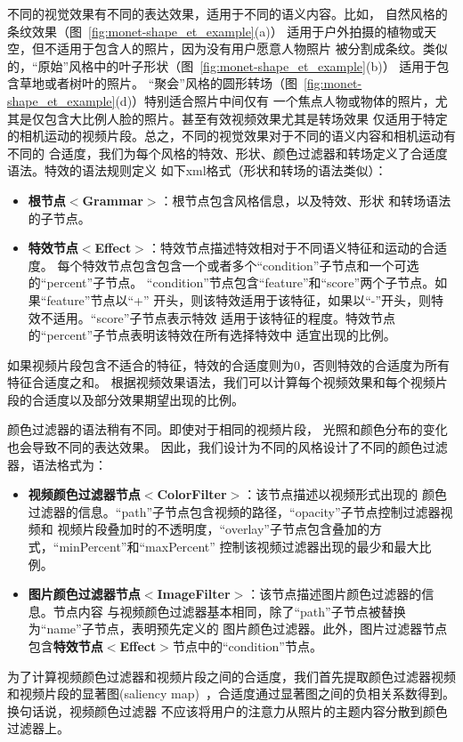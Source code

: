 不同的视觉效果有不同的表达效果，适用于不同的语义内容。比如，
自然风格的条纹效果（图~\ref{fig:monet-shape_et_example}(a)）
适用于户外拍摄的植物或天空，但不适用于包含人的照片，因为没有用户愿意人物照片
被分割成条纹。类似的，``原始''风格中的叶子形状（图~\ref{fig:monet-shape_et_example}(b)）
适用于包含草地或者树叶的照片。
``聚会''风格的圆形转场（图~\ref{fig:monet-shape_et_example}(d)）特别适合照片中间仅有
一个焦点人物或物体的照片，尤其是仅包含大比例人脸的照片。甚至有效视频效果尤其是转场效果
仅适用于特定的相机运动的视频片段。总之，不同的视觉效果对于不同的语义内容和相机运动有不同的
合适度，我们为每个风格的特效、形状、颜色过滤器和转场定义了合适度语法。特效的语法规则定义
如下xml格式（形状和转场的语法类似）：
\begin{itemize}
    \item \textbf{根节点$<$Grammar$>$}：根节点包含风格信息，以及特效、形状
        和转场语法的子节点。
    \item
        \textbf{特效节点$<$Effect$>$}：特效节点描述特效相对于不同语义特征和运动的合适度。
        每个特效节点包含包含一个或者多个``condition''子节点和一个可选的``percent''子节点。
        ``condition''节点包含``feature''和``score''两个子节点。如果``feature''节点以``+''
        开头，则该特效适用于该特征，如果以``-''开头，则特效不适用。``score''子节点表示特效
        适用于该特征的程度。特效节点的``percent''子节点表明该特效在所有选择特效中
        适宜出现的比例。
\end{itemize}
如果视频片段包含不适合的特征，特效的合适度则为$0$，否则特效的合适度为所有特征合适度之和。
根据视频效果语法，我们可以计算每个视频效果和每个视频片段的合适度以及部分效果期望出现的比例。


颜色过滤器的语法稍有不同。即使对于相同的视频片段，
光照和颜色分布的变化也会导致不同的表达效果。
因此，我们设计为不同的风格设计了不同的颜色过滤器，语法格式为：
\begin{itemize}
    \item \textbf{视频颜色过滤器节点$<$ColorFilter$>$}：该节点描述以视频形式出现的
        颜色过滤器的信息。``path''子节点包含视频的路径，``opacity''子节点控制过滤器视频和
        视频片段叠加时的不透明度，``overlay''子节点包含叠加的方式，``minPercent''和``maxPercent''
        控制该视频过滤器出现的最少和最大比例。
    \item
        \textbf{图片颜色过滤器节点$<$ImageFilter$>$}：该节点描述图片颜色过滤器的信息。节点内容
        与视频颜色过滤器基本相同，除了``path''子节点被替换为``name''子节点，表明预先定义的
        图片颜色过滤器。此外，图片过滤器节点包含\textbf{特效节点$<$Effect$>$}节点中的``condition''节点。
\end{itemize}
为了计算视频颜色过滤器和视频片段之间的合适度，我们首先提取颜色过滤器视频和视频片段的显著图(saliency
map)~\cite{ma2003saliency}，合适度通过显著图之间的负相关系数得到。换句话说，视频颜色过滤器
不应该将用户的注意力从照片的主题内容分散到颜色过滤器上。


